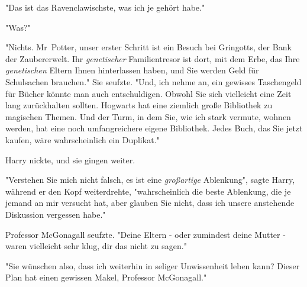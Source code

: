 "Das ist das Ravenclawischste, was ich je gehört habe."

"Was?" 

"Nichts. Mr~Potter, unser erster Schritt ist ein Besuch bei Gringotts, der Bank der Zaubererwelt. Ihr \emph{genetischer} Familientresor ist dort, mit dem Erbe, das Ihre \emph{genetischen} Eltern Ihnen hinterlassen haben, und Sie werden Geld für Schulsachen brauchen." Sie seufzte. "Und, ich nehme an, ein gewisses Taschengeld für Bücher könnte man auch entschuldigen. Obwohl Sie sich vielleicht eine Zeit lang zurückhalten sollten. Hogwarts hat eine ziemlich große Bibliothek zu magischen Themen. Und der Turm, in dem Sie, wie ich stark vermute, wohnen werden, hat eine noch umfangreichere eigene Bibliothek. Jedes Buch, das Sie jetzt kaufen, wäre wahrscheinlich ein Duplikat." 

Harry nickte, und sie gingen weiter. 

"Verstehen Sie mich nicht falsch, es ist eine \emph{großartige} Ablenkung", sagte Harry, während er den Kopf weiterdrehte, "wahrscheinlich die beste Ablenkung, die je jemand an mir versucht hat, aber glauben Sie nicht, dass ich unsere anstehende Diskussion vergessen habe." 

Professor McGonagall seufzte. "Deine Eltern - oder zumindest deine Mutter - waren vielleicht sehr klug, dir das nicht zu sagen." 

"Sie wünschen also, dass ich weiterhin in seliger Unwissenheit leben kann? Dieser Plan hat einen gewissen Makel, Professor McGonagall." 

